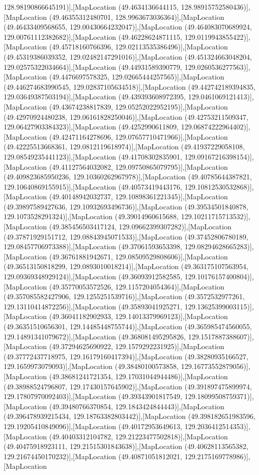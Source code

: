128.98190866645191)],[MapLocation (49.4634136644115, 128.98915752580436)],[MapLocation (49.46355312480701, 128.9963673036364)],[MapLocation (49.46433409568655, 129.00430664232047)],[MapLocation (49.464083070689924, 129.00761112382682)],[MapLocation (49.46228624871115, 129.0119943855422)],[MapLocation (49.45718160766396, 129.02113535386496)],[MapLocation (49.45319386039352, 129.02482147291016)],[MapLocation (49.451324663048204, 129.02575322034664)],[MapLocation (49.44931589390779, 129.0260536277563)],[MapLocation (49.4476697578325, 129.02665444257565)],[MapLocation (49.446274683990545, 129.02837105634518)],[MapLocation (49.442742189394835, 129.03649387503194)],[MapLocation (49.439393608972395, 129.0461069121413)],[MapLocation (49.43674238817839, 129.05252022952195)],[MapLocation (49.42970924480238, 129.06161828250046)],[MapLocation (49.42753211509347, 129.06427903384323)],[MapLocation (49.4252990611809, 129.06874222964402)],[MapLocation (49.42471164278696, 129.07657710471966)],[MapLocation (49.42225513668361, 129.0812119618974)],[MapLocation (49.41937229058108, 129.08549235441123)],[MapLocation (49.41708302835901, 129.09167216398154)],[MapLocation (49.41127564032082, 129.09750865079795)],[MapLocation (49.409823685950236, 129.10360262967978)],[MapLocation (49.40785644387821, 129.10640869155915)],[MapLocation (49.40573419443176, 129.10812530532868)],[MapLocation (49.40148942032737, 129.10898361221345)],[MapLocation (49.39897589427636, 129.10932693496736)],[MapLocation (49.39534501840878, 129.1073528291324)],[MapLocation (49.39014960615688, 129.10211715713532)],[MapLocation (49.385456503417124, 129.09662399307282)],[MapLocation (49.37871929151712, 129.08843945071533)],[MapLocation (49.37452806780189, 129.08457706973388)],[MapLocation (49.37061593653398, 129.08294628665283)],[MapLocation (49.36761881942671, 129.08509529808606)],[MapLocation (49.36513150818299, 129.0893010018214)],[MapLocation (49.363175107563954, 129.09369348929124)],[MapLocation (49.36093912582585, 129.10176157400804)],[MapLocation (49.35770053572526, 129.1157204054364)],[MapLocation (49.357085582427906, 129.1255251539716)],[MapLocation (49.3572532977261, 129.13110414872256)],[MapLocation (49.35893041925271, 129.13625399003115)],[MapLocation (49.36041182902933, 129.14013379969123)],[MapLocation (49.36351510656301, 129.14485448755744)],[MapLocation (49.365985474560055, 129.14891341079672)],[MapLocation (49.368081495295826, 129.1517887388607)],[MapLocation (49.37294625690922, 129.1579292231925)],[MapLocation (49.37772437718975, 129.16179160417394)],[MapLocation (49.38280935166527, 129.1659973079093)],[MapLocation (49.38480100573858, 129.16773552879056)],[MapLocation (49.38681241721354, 129.17031044944486)],[MapLocation (49.38988524796807, 129.17430157645902)],[MapLocation (49.391897475899974, 129.17807970092403)],[MapLocation (49.39343901817549, 129.18099508759371)],[MapLocation (49.39480766370854, 129.1843424844443)],[MapLocation (49.396478939215434, 129.18763382803442)],[MapLocation (49.398182651983596, 129.19205410849096)],[MapLocation (49.40172953649613, 129.2036412514353)],[MapLocation (49.40403312104782, 129.21223477502818)],[MapLocation (49.40475918923111, 129.21515301843638)],[MapLocation (49.40628113565382, 129.21674450170232)],[MapLocation (49.40871051812021, 129.2175169778986)],[MapLocation 